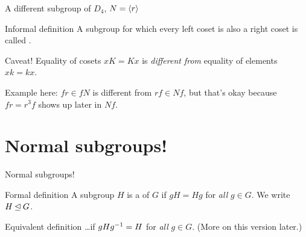 \documentclass[8pt, handout]{beamer}
\begin{document}
\begin{frame}{A different subgroup of $D_4$, $N = \langle r\rangle$}
  \begin{exampleblock}{Informal definition}
    A subgroup for which every left coset is also a right coset is called .
  \end{exampleblock}
  \begin{alertblock}{Caveat!}
    Equality of cosets $xK=Kx$  is \emph{different from} 
    equality of elements $xk=kx$.

    Example here: $fr \in fN$ is different from $rf \in Nf$, but that's okay because $fr = r^3f$ shows up later in $Nf$.
  \end{alertblock}
  
\end{frame}

\section{Normal subgroups!}


\begin{frame}{Normal subgroups!}
  \begin{block}{Formal definition}
    A subgroup $H$ is a  of $G$ if
    $gH=Hg$ for \emph{all} $g\in G$. We write $H\unlhd G$. 
  \end{block} \pause
  \begin{block}{Equivalent definition}
    \ldots if $gHg^{-1} = H$ for \emph{all} $g \in G$. (More on this version later.)
  \end{block}
\end{frame}

\end{document}

